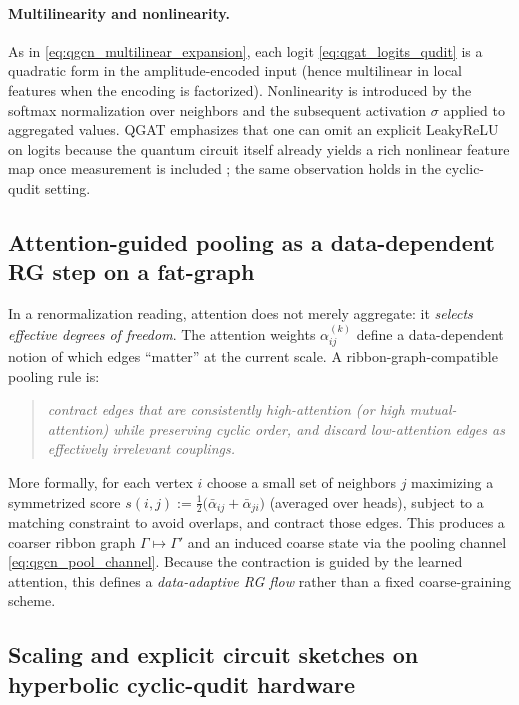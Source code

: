 \documentclass[11pt,oneside]{amsbook}
\numberwithin{equation}{section}
\theoremstyle{plain}
\theoremstyle{definition}
\theoremstyle{remark}
\begin{document}
\paragraph{Multilinearity and nonlinearity.}
As in \eqref{eq:qgcn_multilinear_expansion}, each logit \eqref{eq:qgat_logits_qudit} is a quadratic form in the amplitude-encoded
input (hence multilinear in local features when the encoding is factorized).
Nonlinearity is introduced by the softmax normalization over neighbors and the subsequent activation $\sigma$ applied to aggregated
values.  QGAT emphasizes that one can omit an explicit LeakyReLU on logits because the quantum circuit itself already yields a rich
nonlinear feature map once measurement is included \cite{Ning2025QGAT}; the same observation holds in the cyclic-qudit setting.

\subsection{Attention-guided pooling as a data-dependent RG step on a fat-graph}
\label{subsec:qgat_pooling_rg}

In a renormalization reading, attention does not merely aggregate: it \emph{selects effective degrees of freedom}.
The attention weights $\alpha_{ij}^{(k)}$ define a data-dependent notion of which edges ``matter'' at the current scale.
A ribbon-graph-compatible pooling rule is:

\begin{quote}
\emph{contract edges that are consistently high-attention (or high mutual-attention) while preserving cyclic order, and discard low-attention
edges as effectively irrelevant couplings.}
\end{quote}

More formally, for each vertex $i$ choose a small set of neighbors $j$ maximizing a symmetrized score
$s(i,j):=\frac{1}{2}\big(\bar\alpha_{ij}+\bar\alpha_{ji}\big)$ (averaged over heads), subject to a matching constraint to avoid overlaps,
and contract those edges.  This produces a coarser ribbon graph $\Gamma\mapsto \Gamma'$ and an induced coarse state via the pooling
channel \eqref{eq:qgcn_pool_channel}.  Because the contraction is guided by the learned attention, this defines a \emph{data-adaptive RG flow}
rather than a fixed coarse-graining scheme.

\subsection{Scaling and explicit circuit sketches on hyperbolic cyclic-qudit hardware}
\label{subsec:qgat_hyperbolic_scaling}
\end{document}
